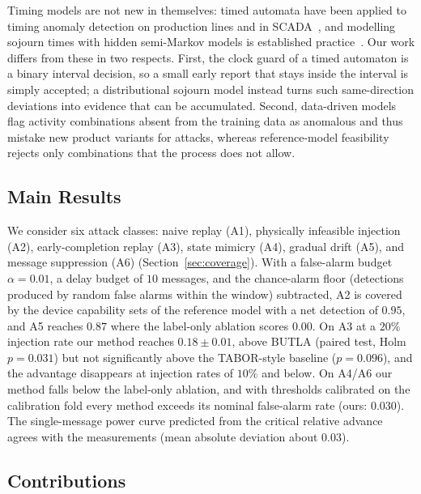 \documentclass[manuscript,screen,review]{acmart}
\begin{document}
Timing models are not new in themselves: timed automata have been applied to timing anomaly detection on production lines and in {SCADA}~\cite{maier2011timed,lin2018timing}, and modelling sojourn times with hidden semi-Markov models is established practice~\cite{tan2008hsmm}. Our work differs from these in two respects. First, the clock guard of a timed automaton is a binary interval decision, so a small early report that stays inside the interval is simply accepted; a distributional sojourn model instead turns such same-direction deviations into evidence that can be accumulated. Second, data-driven models flag activity combinations absent from the training data as anomalous and thus mistake new product variants for attacks, whereas reference-model feasibility rejects only combinations that the process does not allow.

\subsection{Main Results}
\label{sec:intro_results}

We consider six attack classes: naive replay ({A1}), physically infeasible injection ({A2}), early-completion replay ({A3}), state mimicry ({A4}), gradual drift ({A5}), and message suppression ({A6}) (Section~\ref{sec:coverage}). With a false-alarm budget $\alpha=0.01$, a delay budget of $10$ messages, and the chance-alarm floor (detections produced by random false alarms within the window) subtracted, {A2} is covered by the device capability sets of the reference model with a net detection of $0.95$, and {A5} reaches $0.87$ where the label-only ablation scores $0.00$. On {A3} at a $20\%$ injection rate our method reaches $0.18{\pm}0.01$, above {BUTLA} (paired test, {Holm} $p=0.031$) but not significantly above the {TABOR}-style baseline ($p=0.096$), and the advantage disappears at injection rates of $10\%$ and below. On {A4}/{A6} our method falls below the label-only ablation, and with thresholds calibrated on the calibration fold every method exceeds its nominal false-alarm rate (ours: $0.030$). The single-message power curve predicted from the critical relative advance agrees with the measurements (mean absolute deviation about $0.03$).

\subsection{Contributions}
\label{sec:intro_contrib}
\end{document}
